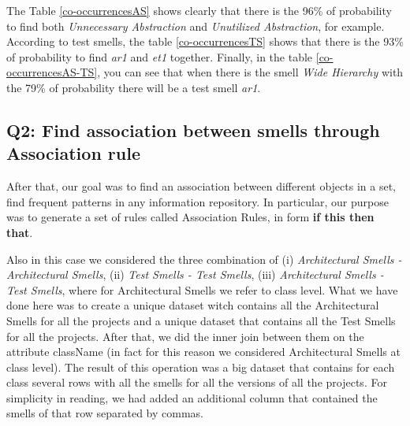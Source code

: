 \begin{table}[!ht]
\caption{Co-occurrences Architectural Smell - Test Smell in \emph{Apollo} project.}\label{co-occurrencesAS-TS}
\end{table}\mbox{}



The Table \ref{co-occurrencesAS} shows clearly that there is the 96\% of probability to find both \emph{Unnecessary Abstraction} and \emph{Unutilized Abstraction}, for example. According to test smells, the table \ref{co-occurrencesTS} shows that there is the 93\% of probability to find \emph{ar1} and \emph{et1} together. Finally, in the table \ref{co-occurrencesAS-TS}, you can see that when there is the smell \emph{Wide Hierarchy} with the 79\% of probability there will be a test smell \emph{ar1}.
\par\hfill

\subsection{Q2: Find association between smells through Association rule}
After that, our goal was to find an association between different objects in a set, find frequent patterns in any information repository. In particular, our purpose was to generate a set of rules called Association Rules, in form \textbf{if this then that}.

Also in this case we considered the three combination of (i) \textit{Architectural Smells - Architectural Smells}, (ii) \textit{Test Smells - Test Smells}, (iii) \textit{Architectural Smells - Test Smells}, where for Architectural Smells we refer to class level.
What we have done here was to create a unique dataset witch contains all the Architectural Smells for all the projects and a unique dataset that contains all the Test Smells for all the projects. After that, we did the inner join between them on the attribute className (in fact for this reason we considered Architectural Smells at class level). The result of this operation was a big dataset that contains for each class several rows with all the smells for all the versions of all the projects. For simplicity in reading, we had added an additional column that contained the smells of that row separated by commas.

